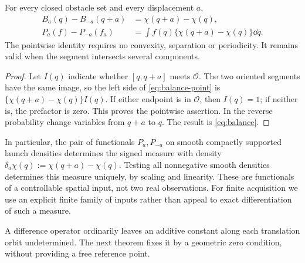 \begin{theorem}\label{thm:balance}
For every closed obstacle set and every displacement $a$,
\begin{align}
 B_a(q)-B_{-a}(q+a)&=\chi(q+a)-\chi(q),\label{eq:balance-point}\\
 P_a(f)-P_{-a}(f_a)&=
       \int f(q)\{\chi(q+a)-\chi(q)\}\dd q.\label{eq:balance}
\end{align}
The pointwise identity requires no convexity, separation or periodicity.
It remains valid when the segment intersects several components.
\end{theorem}
\begin{proof}
Let $I(q)$ indicate whether $[q,q+a]$ meets $\mathcal O$. The two
oriented segments have the same image, so the left side of
\eqref{eq:balance-point} is
$\{\chi(q+a)-\chi(q)\}I(q)$. If either endpoint is in $\mathcal O$,
then $I(q)=1$; if neither is, the prefactor is zero. This proves the
pointwise assertion. In the reverse probability change variables from
$q+a$ to $q$. The result is \eqref{eq:balance}.
\end{proof}

In particular, the pair of functionals $P_a,P_{-a}$ on smooth compactly
supported launch densities determines the signed measure with density
$\delta_a\chi(q):=\chi(q+a)-\chi(q)$. Testing all nonnegative smooth
densities determines this measure uniquely, by scaling and linearity.
These are functionals of a controllable spatial input, not two real
observations. For finite acquisition we use an explicit finite family
of inputs rather than appeal to exact differentiation of such a measure.

A difference operator ordinarily leaves an additive constant along each
translation orbit undetermined. The next theorem fixes it by a geometric
zero condition, without providing a free reference point.

